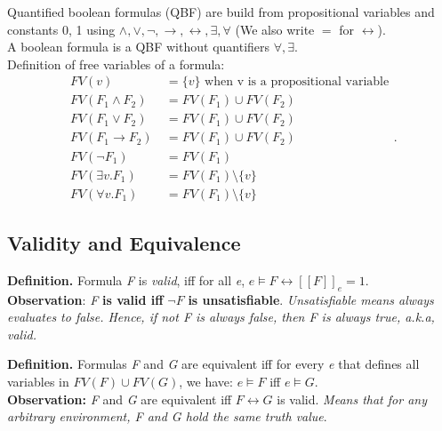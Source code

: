 \documentclass[11pt]{article}
\begin{document}
Quantified boolean formulas (QBF) are build from propositional variables and constants 0, 1 using $\land, \lor, \neg, \to, \leftrightarrow, \exists, \forall$ (We also write $=$ for $\leftrightarrow$). \\
A boolean formula is a QBF without quantifiers $\forall, \exists$. \\
Definition of free variables of a formula: 
\[
	\begin{align*}
		FV(v) &\ = \{v\} \text{ when v is a propositional variable} \\ 
		FV(F_1 \land F_2) &\ =  FV(F_1) \cup FV(F_2) \\ 
		FV(F_1 \lor F_2) &\ = FV(F_1) \cup FV(F_2) \\ 
		FV(F_1 \to F_2) &\ = FV(F_1) \cup FV(F_2) \\ 
		FV(\neg F_1) &\ = FV(F_1) \\ 
		FV(\exists v. F_1) &\ = FV(F_1) \setminus \{v\} \\
		FV(\forall v. F_1) &\ = FV(F_1) \setminus \{v\}
	\end{align*}
.\] 

\subsection*{Validity and Equivalence}

\begin{tcolorbox}[
    enhanced,
    frame hidden,
    borderline west={2pt}{0pt}{black},
    boxsep=5pt,
    left=8pt
]
\textbf{Definition.} Formula \textit{F} is \emph{valid}, iff for all \textit{e}, $e \models F \leftrightarrow [\![F]\!]_e = 1.$  \\ 

\textbf{Observation}: \textit{F} \textbf{is valid iff} $\neg F$ \textbf{is unsatisfiable}. \emph{Unsatisfiable means always evaluates to false. Hence, if not F is always false, then F is always true, a.k.a, valid. }
\end{tcolorbox}

\begin{tcolorbox}[
    enhanced,
    frame hidden,
    borderline west={2pt}{0pt}{black},
    boxsep=5pt,
    left=8pt
]
\textbf{Definition.} Formulas \textit{F} and \textit{G} are equivalent iff for every \textit{e} that defines all variables in $FV(F) \cup FV(G)$, we have: $e \models F$ iff $e \models G$. \\ 

\textbf{Observation:} \textit{F} and \textit{G} are equivalent iff $F \leftrightarrow G$ is valid. \emph{Means that for any arbitrary environment, F and G hold the same truth value}. 
\end{tcolorbox}
\end{document}
